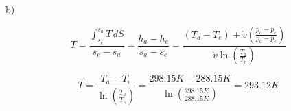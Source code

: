 b)

\[
T = \frac{\int_{s_e}^{s_a} T \, dS}{s_e - s_a} = \frac{h_a - h_e}{s_a - s_e} = \frac{(T_a - T_e) + \dot{v} \left( \frac{p_a - p_e}{p_a - p_e} \right)}{\dot{v} \ln \left( \frac{T_a}{T_e} \right)}
\]

\[
T = \frac{T_a - T_e}{\ln \left( \frac{T_a}{T_e} \right)} = \frac{298.15 K - 288.15 K}{\ln \left( \frac{298.15 K}{288.15 K} \right)} = 293.12 K
\]